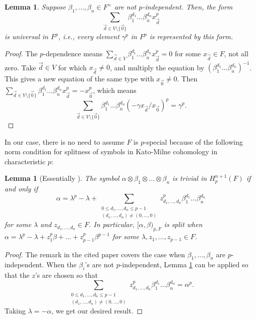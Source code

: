 \documentclass[preprint, 10pt, english]{elsarticle}
\newtheorem{lem}[thm]{Lemma}
\theoremstyle{definition}
\renewcommand{\leq}{\leqslant}
\begin{document}
\begin{lem}\label{ourlemma}
Suppose $\beta_1,\dots,\beta_n \in F^\times$ are not $p$-independent. Then, the form 
\[\sum_{\vec{d}\in V \setminus \{\vec{0}\}} \beta_1^{d_1} \dots \beta_n^{d_n} x_{\vec{d}}^p\] 
is universal in $F^p$, i.e., every element $\gamma^p$ in $F^p$ is represented by this form.
\end{lem}

\begin{proof}
The $p$-dependence means $\sum_{\vec{d} \in V} \beta_1^{d_1} \dots \beta_n^{d_n} x_{\vec{d}}^p=0$ for some $x_{\vec{d}} \in F$, not all zero.
Take $\vec{d} \in V$ for which $x_{\vec{d}} \neq 0$, and multiply the equation by $(\beta_1^{d_1}\dots\beta_n^{d_n})^{-1}$. This gives a new equation of the same type with $x_{\vec{0}}\neq 0$.
Then
$\sum_{\vec{d}\in V \setminus \{\vec{0}\}} \beta_1^{d_1} \dots \beta_n^{d_n} x_{\vec{d}}^p=-x_{\vec{0}}^p$, which means 
\[\sum_{\vec{d}\in V \setminus \{\vec{0}\}} \beta_1^{d_1} \dots \beta_n^{d_n} (-\gamma{x_{\vec{d}}}/{x_{\vec{0}}})^p=\gamma^p.\]
 \end{proof}

In our case, there is no need to assume $F$ is $p$-special because of the following norm condition for splitness of symbols in Kato-Milne cohomology in characteristic $p$:

\begin{lem}[Essentially {\cite{ArasonBaeza:2010}}]\label{ABlem}
The symbol $\alpha \otimes \beta_1 \otimes \dots \otimes \beta_n$ is trivial in $H_p^{n+1}(F)$ if and only if 
$$\alpha=\lambda^p-\lambda+\sum_{\begin{matrix}0\leq d_1,\dots,d_n \leq p-1\\ (d_1,\dots,d_n)\neq (0,\dots,0)\end{matrix}} z_{d_1,\dots,d_n}^p \beta_1^{d_1} \dots \beta_n^{d_n}$$ for some $\lambda$ and $z_{d_1,\dots,d_n} \in F$.
In particular, $[\alpha,\beta)_{p,F}$ is split when $\alpha=\lambda^p-\lambda+ z_1^p \beta+\dots+z_{p-1}^p \beta^{p-1}$ for some $\lambda,z_1,\dots,z_{p-1}\in F$.
\end{lem}
\begin{proof} The remark in the cited paper covers the case when $\beta_1,\ldots,\beta_n$ are $p$-independent. When the $\beta_i$'s are not $p$-independent, Lemma \ref{ourlemma} can be applied so that the $z$'s are chosen so that 
\[\sum_{\begin{matrix}0\leq d_1,\dots,d_n \leq p-1\\ (d_1,\dots,d_n)\neq (0,\dots,0)\end{matrix}} z_{d_1,\dots,d_n}^p \beta_1^{d_1} \dots \beta_n^{d_n}=\alpha^p.\]
Taking $\lambda = -\alpha$, we get our desired result.

\end{proof}
\end{document}
